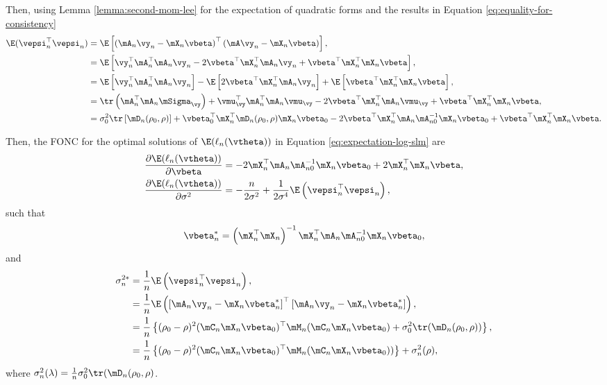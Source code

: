 \begin{subappendices}
Then, using Lemma \ref{lemma:second-mom-lee} for the expectation of quadratic forms and the results in Equation \eqref{eq:equality-for-consistency}
\begin{equation}
\begin{aligned}
\E(\vepsi_n^\top\vepsi_n) & = \E\left[\left(\mA_n\vy_n - \mX_n\vbeta\right)^\top\left(\mA\vy_n - \mX_n\vbeta\right)\right], \\
& = \E\left[\vy_n^\top\mA_n^\top\mA_n\vy_n - 2\vbeta^\top\mX_n^\top\mA_n\vy_n + \vbeta^\top\mX_n^\top\mX_n\vbeta\right], \\
& = \E\left[\vy_n^\top\mA_n^\top\mA_n\vy_n \right]- \E\left[2\vbeta^\top\mX_n^\top\mA_n\vy_n\right] + \E\left[\vbeta^\top\mX_n^\top\mX_n\vbeta\right], \\
& = \tr\left(\mA_n^\top\mA_n\mSigma_{\vy}\right) + \vmu_{\vy}^\top\mA_n^\top\mA_n\vmu_{\vy} - 2\vbeta^\top\mX_n^\top\mA_n\vmu_{\vy} + \vbeta^\top\mX_n^\top\mX_n\vbeta, \\
& = \sigma_0^2\tr\left[\mD_n(\rho_0, \rho)\right] + \vbeta_0^\top\mX_n^\top\mD_n(\rho_0, \rho)\mX_n\vbeta_0 -2\vbeta^\top\mX_n^\top\mA_n\mA_{n0}^{-1}\mX_n\vbeta_0 + \vbeta^\top\mX_n^\top\mX_n\vbeta.
\end{aligned}
\end{equation}

Then, the FONC for the optimal solutions of $\E(\ell_n(\vtheta))$ in Equation \eqref{eq:expectation-log-slm} are 
\begin{equation*}
\begin{aligned}
\frac{\partial  \E(\ell_n(\vtheta))}{\partial \vbeta} & = -2\mX_n^\top\mA_n\mA_{n0}^{-1}\mX_n\vbeta_0 +  2\mX_n^\top\mX_n\vbeta, \\
\frac{\partial  \E(\ell_n(\vtheta))}{\partial \sigma^2} & = -\frac{n}{2\sigma^2} + \frac{1}{2\sigma^4}\E\left(\vepsi_n^\top\vepsi_n\right), 
\end{aligned}
\end{equation*}
%
such that
\begin{equation*}
\vbeta_n^*  = \left(\mX_n^\top\mX_n\right)^{-1}\mX_n^\top\mA_n\mA_{n0}^{-1}\mX_n\vbeta_0,
\end{equation*}
and 
\begin{equation}\label{eq:sigma-star-consistency}
\begin{aligned}
\sigma^{2*}_n  &  = \frac{1}{n}\E\left(\vepsi_n^\top\vepsi_n\right), \\
               & =  \frac{1}{n}\E\left(\left[\mA_n\vy_n - \mX_n\vbeta_n^*\right]^\top \left[\mA_n\vy_n - \mX_n\vbeta_n^*\right]\right), \\
               &= \frac{1}{n}\left\lbrace (\rho_0 - \rho)^2(\mC_n\mX_n\vbeta_0)^\top \mM_n(\mC_n\mX_n\vbeta_0) + \sigma_0^2\tr(\mD_n(\rho_0, \rho)) \right\rbrace, \\
               & = \frac{1}{n}\left\lbrace (\rho_0 - \rho)^2(\mC_n\mX_n\vbeta_0)^\top \mM_n(\mC_n\mX_n\vbeta_0))\right\rbrace + \sigma_n^2(\rho), 
\end{aligned}
\end{equation}
%
where $\sigma_n^2(\lambda) = \frac{1}{n}\sigma_0^2\tr(\mD_n(\rho_0, \rho)$.


\end{subappendices}
